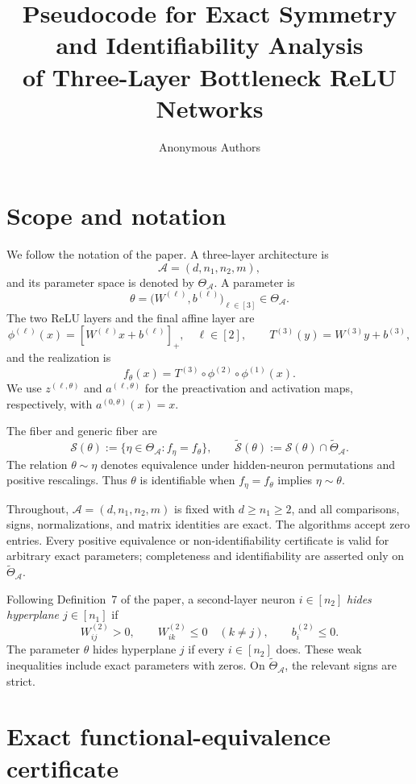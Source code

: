 \documentclass[11pt]{article}
\title{Pseudocode for Exact Symmetry and Identifiability Analysis\\
of Three-Layer Bottleneck ReLU Networks}
\author{Anonymous Authors}
\date{}
\begin{document}
\maketitle

\section{Scope and notation}

We follow the notation of the paper.  A three-layer architecture is
\[
  \mathcal A=(d,n_1,n_2,m),
\]
and its parameter space is denoted by \(\Theta_{\mathcal A}\).  A parameter is
\[
  \theta
  =
  \bigl(W^{(\ell)},b^{(\ell)}\bigr)_{\ell\in[3]}
  \in\Theta_{\mathcal A}.
\]
The two ReLU layers and the final affine layer are
\[
  \phi^{(\ell)}(x)
  =
  [W^{(\ell)}x+b^{(\ell)}]_+,\quad \ell\in[2],
  \qquad
  T^{(3)}(y)=W^{(3)}y+b^{(3)},
\]
and the realization is
\[
  f_\theta(x)
  =
  T^{(3)}\circ\phi^{(2)}\circ\phi^{(1)}(x).
\]
We use \(z^{(\ell,\theta)}\) and \(a^{(\ell,\theta)}\) for the preactivation
and activation maps, respectively, with \(a^{(0,\theta)}(x)=x\).

The fiber and generic fiber are
\[
  \mathcal S(\theta)
  :=
  \{\eta\in\Theta_{\mathcal A}:f_\eta=f_\theta\},
  \qquad
  \widetilde{\mathcal S}(\theta)
  :=
  \mathcal S(\theta)\cap\widetilde{\Theta}_{\mathcal A}.
\]
The relation \(\theta\sim\eta\) denotes equivalence under hidden-neuron
permutations and positive rescalings.  Thus \(\theta\) is identifiable when
\(f_\eta=f_\theta\) implies \(\eta\sim\theta\).

Throughout, \(\mathcal A=(d,n_1,n_2,m)\) is fixed with
\(d\geq n_1\geq2\), and all comparisons, signs, normalizations, and matrix
identities are exact.  The algorithms accept zero entries.  Every positive
equivalence or non-identifiability certificate is valid for arbitrary exact
parameters; completeness and identifiability are asserted only on
\(\widetilde{\Theta}_{\mathcal A}\).

Following Definition~7 of the paper, a second-layer neuron \(i\in[n_2]\)
\emph{hides hyperplane \(j\in[n_1]\)} if
\[
  W^{(2)}_{ij}>0,\qquad
  W^{(2)}_{ik}\leq 0\quad(k\neq j),\qquad
  b^{(2)}_i\leq 0.
\]
The parameter \(\theta\) hides hyperplane \(j\) if every \(i\in[n_2]\) does.
These weak inequalities include exact parameters with zeros.  On
\(\widetilde{\Theta}_{\mathcal A}\), the relevant signs are strict.

\section{Exact functional-equivalence certificate}
\end{document}
